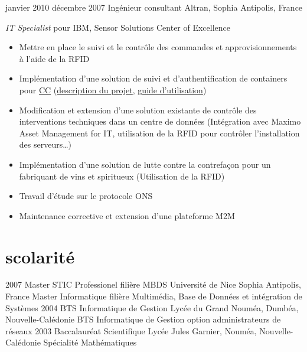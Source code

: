 \documentclass[]{roger-cv}
\begin{document}
\begin{entrylist}
  \entry
    {janvier 2010}
    {décembre 2007}
    {Ingénieur consultant}
    {Altran, Sophia Antipolis, France}  
    {
      \emph{IT Specialist} pour IBM, Sensor Solutions Center of Excellence\\
      \vspace{-3mm}
          \begin{itemize}
 	    \item Mettre en place le suivi et le contrôle des commandes et approvisionnements à l'aide de la RFID
 	    \item Implémentation d'une solution de suivi et d'authentification de containers pour \href{http://www.container-centralen.com/}{CC} (\href{http://www.container-centralen.co.uk/rfid/history.aspx}{description du projet}, \href{http://www.container-centralen.co.uk/rfid/user\%20guide\%20for\%20scanning.aspx}{guide d'utilisation})
               \item Modification et extension d'une solution existante de contrôle des interventions techniques dans un centre de données 
 	    (Intégration avec Maximo Asset Management for IT, utilisation de la RFID pour contrôler l'installation des serveurs\ldots)
 	    \item Implémentation d'une solution de lutte contre la contrefaçon pour un fabriquant de vins et spiritueux (Utilisation de la RFID)
 	    \item Travail d'étude sur le protocole ONS
 	    \item Maintenance corrective et extension d'une plateforme M2M
 	\end{itemize}
    }

\end{entrylist}

\section{scolarité}

\begin{entrylist}
  \entry
    {2007}
    {}
    {Master STIC Professionel {\normalfont filière MBDS}}
    {Université de Nice Sophia Antipolis, France}
    {Master Informatique filière Multimédia, Base de Données et intégration de Systèmes}
  \entry
    {2004}
    {}
    {BTS Informatique de Gestion}
    {Lycée du Grand Nouméa, Dumbéa, Nouvelle-Calédonie}
    {BTS Informatique de Gestion option administrateurs de réseaux}
  \entry
    {2003}
    {}
    {Baccalauréat Scientifique}
    {Lycée Jules Garnier, Nouméa, Nouvelle-Calédonie}
    {Spécialité Mathématiques}
\end{entrylist}
\end{document}
